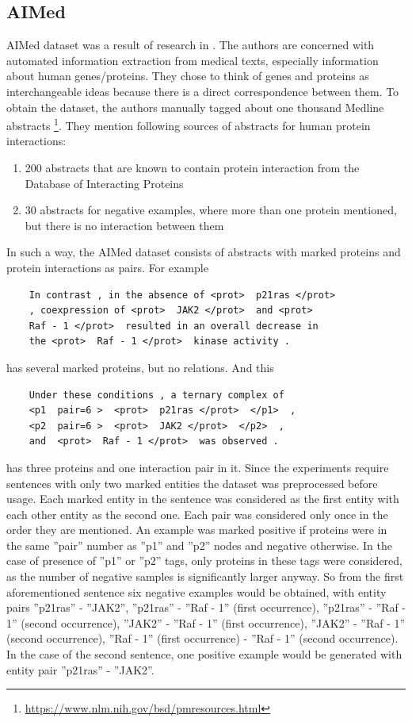 \subsection{AIMed}
AIMed dataset was a result of research in \cite{bunescu2005comparative}.  The authors are 
concerned with automated information extraction from medical texts, especially information about 
human genes/proteins. They chose to think of genes and proteins as interchangeable ideas 
because there is a direct correspondence between them. To obtain the dataset, the authors manually 
tagged about one thousand Medline abstracts \footnote{\url{https://www.nlm.nih.gov/bsd/pmresources.html}}.
They mention following sources of abstracts for human protein interactions:
\begin{enumerate}
  \item 200 abstracts that are known to contain protein interaction from the Database of Interacting Proteins
  \item 30 abstracts for negative examples, where more than one protein mentioned, but there is no interaction between them
\end{enumerate}
In such a way, the AIMed dataset consists of abstracts with marked proteins and protein 
interactions as  pairs. For example

  \begin{verbatim}
    In contrast , in the absence of <prot>  p21ras </prot>  
    , coexpression of <prot>  JAK2 </prot>  and <prot>  
    Raf - 1 </prot>  resulted in an overall decrease in 
    the <prot>  Raf - 1 </prot>  kinase activity .
  \end{verbatim}

has several marked proteins, but no relations. And this

\begin{verbatim}
    Under these conditions , a ternary complex of 
    <p1  pair=6 >  <prot>  p21ras </prot>  </p1>  , 
    <p2  pair=6 >  <prot>  JAK2 </prot>  </p2>  , 
    and  <prot>  Raf - 1 </prot>  was observed .
  \end{verbatim}
  
has three proteins and one interaction pair in it. Since the experiments require sentences with 
only two marked entities the dataset was preprocessed before usage. Each marked entity in the 
sentence was considered as the first entity with each other entity as the second one. Each 
pair was considered only once in the order they are mentioned. An example was marked positive if
proteins were in the same ''pair'' number as ''p1'' and ''p2'' nodes and negative otherwise. In 
the case of presence of ''p1'' or ''p2'' tags, only proteins in these tags were considered, as the 
number of negative samples is significantly larger anyway.  So 
from the first aforementioned sentence six negative examples would be obtained, with entity 
pairs ''p21ras'' - ''JAK2'', ''p21ras'' - ''Raf - 1'' (first occurrence), ''p21ras'' - ''Raf - 1'' (second occurrence), ''JAK2'' - ''Raf - 1'' (first occurrence), ''JAK2'' - ''Raf - 1'' (second occurrence), 
''Raf - 1'' (first occurrence) - ''Raf - 1'' (second occurrence). In the case of the second sentence,
one positive example would be generated with entity pair ''p21ras'' - ''JAK2''.

